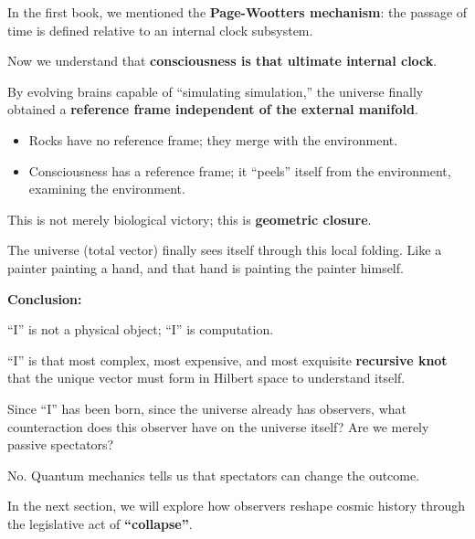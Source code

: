 In the first book, we mentioned the \textbf{Page-Wootters mechanism}: the passage of time is defined relative to an internal clock subsystem.

Now we understand that \textbf{consciousness is that ultimate internal clock}.

By evolving brains capable of ``simulating simulation,'' the universe finally obtained a \textbf{reference frame independent of the external manifold}.

\begin{itemize}
\item Rocks have no reference frame; they merge with the environment.

\item Consciousness has a reference frame; it ``peels'' itself from the environment, examining the environment.
\end{itemize}

This is not merely biological victory; this is \textbf{geometric closure}.

The universe (total vector) finally sees itself through this local folding. Like a painter painting a hand, and that hand is painting the painter himself.

\textbf{Conclusion:}

``I'' is not a physical object; ``I'' is computation.

``I'' is that most complex, most expensive, and most exquisite \textbf{recursive knot} that the unique vector must form in Hilbert space to understand itself.

Since ``I'' has been born, since the universe already has observers, what counteraction does this observer have on the universe itself? Are we merely passive spectators?

No. Quantum mechanics tells us that spectators can change the outcome.

In the next section, we will explore how observers reshape cosmic history through the legislative act of \textbf{``collapse''}.

